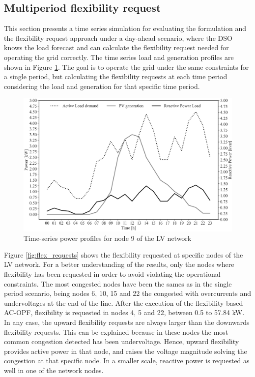 \subsection{Multiperiod flexibility request}
This section presents a time series simulation for evaluating the formulation and the flexibility request approach under a day-ahead scenario, where the DSO knows the load forecast and can calculate the flexibility request needed for operating the grid correctly. The time series load and generation profiles are shown in Figure \ref{fig:data_opf_multiperiod}. The goal is to operate the grid under the same constraints for a single period, but calculating the flexibility requests at each time period considering the load and generation for that specific time period. 

\begin{figure}[htbp]
	\centering
	\includegraphics[width=0.8\columnwidth ]{ChapterOPF_DSO/Figures/p_q_profile_2.png}
		\caption{Time-series power profiles for node 9 of the LV network}
	\label{fig:data_opf_multiperiod}  
\end{figure}

Figure \ref{fig:flex_requests} shows the flexibility requested at specific nodes of the LV network. For a better understanding of the results, only the nodes where flexibility has been requested in order to avoid violating the operational constraints. The most congested nodes have been the sames as in the single period scenario, being nodes 6, 10, 15 and 22 the congested with overcurrents and undervoltages at the end of the line. After the execution of the flexibility-based AC-OPF, flexibility is requested in nodes 4, 5 and 22, between 0.5 to 57.84 kW. In any case, the upward flexibility requests are always larger than the downwards flexibility requests. This can be explained because in these nodes the most common congestion detected has been undervoltage. Hence, upward flexibility provides active power in that node, and raises the voltage magnitude solving the congestion at that specific node. In a smaller scale, reactive power is requested as well in one of the network nodes. 

